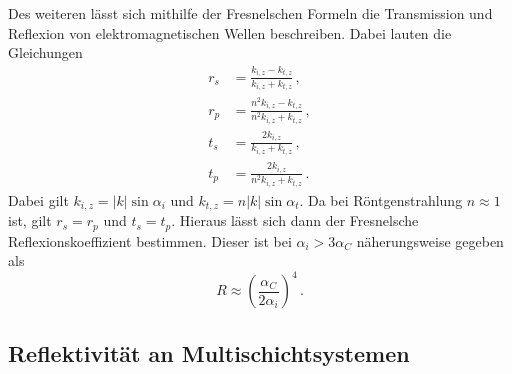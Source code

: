 Des weiteren lässt sich mithilfe der Fresnelschen Formeln die Transmission und Reflexion von elektromagnetischen Wellen beschreiben.
Dabei lauten die Gleichungen
\begin{align*}
    r_s & =\frac{k_{i,z} - k_{t,z}}{k_{i,z} + k_{t,z}} \, ,\\
    r_p & =\frac{n^2 k_{i,z} - k_{t,z}}{n^2 k_{i,z} + k_{t,z}} \, ,\\
    t_s & =\frac{2 k_{i,z}}{k_{i,z} + k_{t,z}} \, ,\\
    t_p & =\frac{2 k_{i,z}}{n^2 k_{i,z} + k_{t,z}} \, .
\end{align*}
Dabei gilt $k_{i,z} = |k| \sin \alpha_i$ und $k_{t,z} = n |k| \sin \alpha_t$.
Da bei Röntgenstrahlung $n \approx 1$ ist, gilt $r_s = r_p$ und $t_s = t_p$.
Hieraus lässt sich dann der Fresnelsche Reflexionskoeffizient bestimmen.
Dieser ist bei $\alpha_i > 3 \alpha_C$ näherungsweise gegeben als \cite{tolan_xray}
\begin{equation}
    R\approx \left( \frac{\alpha_C}{2 \alpha_i} \right)^4 \, .
\end{equation}

\subsection{Reflektivität an Multischichtsystemen}

